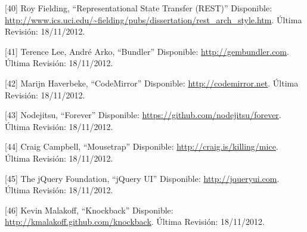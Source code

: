 \documentclass[12pt,spanish,letter]{report}
\begin{document}
{[}40{]} Roy Fielding, ``Representational State Transfer (REST)''
Disponible:
\href{http://www.ics.uci.edu/~fielding/pubs/dissertation/rest\_arch\_style.htm}{http://www.ics.uci.edu/\textasciitilde{}fielding/pubs/dissertation/rest\_arch\_style.htm}.
Última Revisión: 18/11/2012.

{[}41{]} Terence Lee, André Arko, ``Bundler'' Disponible:
\href{http://gembundler.com}{http://gembundler.com}. Última Revisión:
18/11/2012.

{[}42{]} Marijn Haverbeke, ``CodeMirror'' Disponible:
\href{http://codemirror.net}{http://codemirror.net}. Última Revisión:
18/11/2012.

{[}43{]} Nodejitsu, ``Forever'' Disponible:
\href{https://github.com/nodejitsu/forever}{https://github.com/nodejitsu/forever}.
Última Revisión: 18/11/2012.

{[}44{]} Craig Campbell, ``Mousetrap'' Disponible:
\href{http://craig.is/killing/mice}{http://craig.is/killing/mice}.
Última Revisión: 18/11/2012.

{[}45{]} The jQuery Foundation, ``jQuery UI'' Disponible:
\href{http://jqueryui.com}{http://jqueryui.com}. Última Revisión:
18/11/2012.

{[}46{]} Kevin Malakoff, ``Knockback'' Disponible:
\href{http://kmalakoff.github.com/knockback}{http://kmalakoff.github.com/knockback}.
Última Revisión: 18/11/2012.
\end{document}
